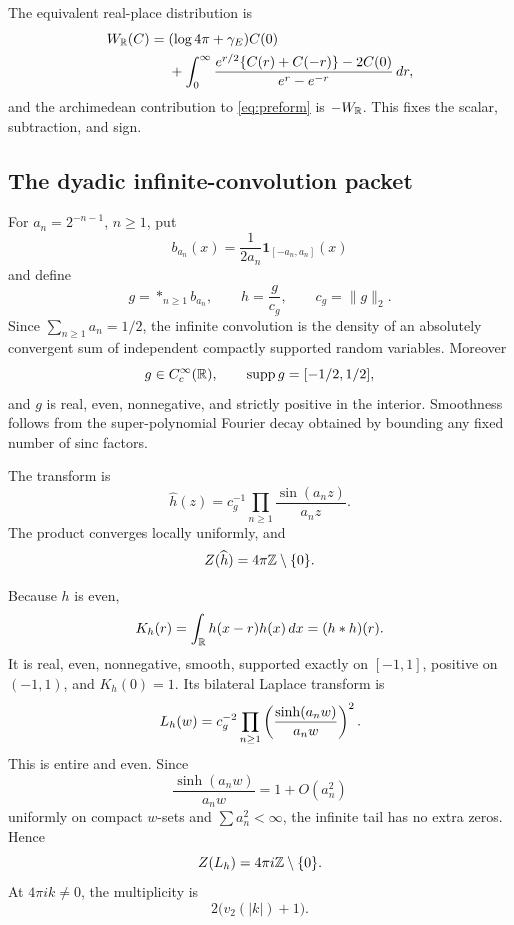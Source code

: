 The equivalent real-place distribution is
\begin{align}
W_{\mathbb R}(C)
={}&
(\log 4\pi+\gamma_E)C(0)
\notag\\
&+
\int_0^\infty
\frac{
e^{r/2}\{C(r)+C(-r)\}-2C(0)
}{
e^r-e^{-r}
}\,dr,
\label{eq:real-place}
\end{align}
and the archimedean contribution to \eqref{eq:preform} is
\(-W_{\mathbb R}\).  This fixes the scalar, subtraction, and sign.

\subsection{The dyadic infinite-convolution packet}

For \(a_n=2^{-n-1}\), \(n\ge1\), put
\[
b_{a_n}(x)=\frac{1}{2a_n}\mathbf1_{[-a_n,a_n]}(x)
\]
and define
\[
g=*_{n\ge1}b_{a_n},\qquad
h=\frac{g}{c_g},\qquad c_g=\lVert g\rVert_2.
\]
Since \(\sum_{n\ge1}a_n=1/2\), the infinite convolution is the density
of an absolutely convergent sum of independent compactly supported random
variables.  Moreover
\[
g\in C_c^\infty(\mathbb R),\qquad
\operatorname{supp} g=[-1/2,1/2],
\]
and \(g\) is real, even, nonnegative, and strictly positive in the
interior.  Smoothness follows from the super-polynomial Fourier decay
obtained by bounding any fixed number of sinc factors.

The transform is
\[
\widehat h(z)
=c_g^{-1}
\prod_{n\ge1}\frac{\sin(a_nz)}{a_nz}.
\]
The product converges locally uniformly, and
\[
Z(\widehat h)=4\pi\mathbb Z\setminus\{0\}.
\]

Because \(h\) is even,
\[
K_h(r)=\int_\mathbb R h(x-r)h(x)\,dx=(h*h)(r).
\]
It is real, even, nonnegative, smooth, supported exactly on \([-1,1]\),
positive on \((-1,1)\), and \(K_h(0)=1\).  Its bilateral Laplace transform
is
\begin{equation}
L_h(w)
=c_g^{-2}
\prod_{n\ge1}
\left(\frac{\sinh(a_nw)}{a_nw}\right)^2.
\label{eq:L-product}
\end{equation}
This is entire and even.  Since
\[
\frac{\sinh(a_nw)}{a_nw}=1+O(a_n^2)
\]
uniformly on compact \(w\)-sets and \(\sum a_n^2<\infty\), the infinite
tail has no extra zeros.  Hence
\begin{equation}
Z(L_h)=4\pi i\mathbb Z\setminus\{0\}.
\label{eq:L-zero-set}
\end{equation}
At \(4\pi i k\ne0\), the multiplicity is
\[
2\bigl(v_2(|k|)+1\bigr).
\]
